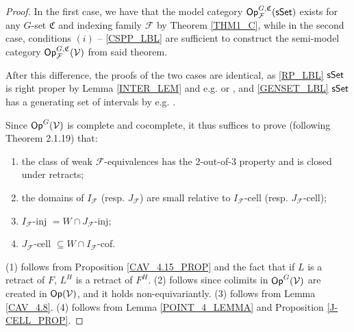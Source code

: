 \documentclass[a4paper,10pt
]{article}%
\renewcommand{\F}{\mathcal F}
\renewcommand{\1}{\ensuremath{\mathbb{id}}}
\begin{document}
\begin{proof}
      In the first case, we have that the model category $\Op^{G,\mathfrak C}_\F(\sSet)$ exists
      for any $G$-set $\mathfrak C$ and indexing family $\F$ by Theorem \ref{THM1_C},
      while in the second case, conditions $(i)$ -- \ref{CSPP_LBL} are sufficient to construct the
      semi-model category $\Op^{G, \mathfrak C}_\F(\V)$ from said theorem.
      
      After this difference, the proofs of the two cases are identical, as
      \ref{RP_LBL} $\mathsf{sSet}$ is right proper
      by Lemma \ref{INTER_LEM} and e.g. \cite[Prop 2.1.5]{Cis06} or \cite[Lemma 1.12]{BM13}, and
      \ref{GENSET_LBL} $\mathsf{sSet}$ has a generating set of intervals
      by e.g. \cite[Lemma 1.12]{BM13}.

      Since $\mathsf{Op}^G(\mathcal V)$ is complete and cocomplete, it thus suffices to prove (following \cite{Hov98} Theorem 2.1.19) that:
      \begin{enumerate}[label = (\arabic*)]
      \item the class of weak $\F$-equivalences has the 2-out-of-3 property and is closed under retracts;
      \item the domains of $I_{\F}$ (resp. $J_{\F}$) are small relative to $I_{\F}$-cell (resp. $J_{\F}$-cell);
      \item $I_{\F}$-inj $= W\cap J_{\F}$-inj;
      \item $J_{\F}$-cell $\subseteq W\cap I_{\F}$-cof.
      \end{enumerate}
      (1) follows from Proposition \ref{CAV_4.15_PROP} and the fact that if $L$ is a retract of $F$, $L^H$ is a retract of $F^H$.
      (2) follows since colimits in $\mathsf{Op}^G(\mathcal V)$ are created in $\mathsf{Op}(\mathcal V)$, and it holds non-equivariantly.
      (3) follows from Lemma \ref{CAV_4.8}.
      (4) follows from Lemma \ref{POINT_4_LEMMA} and Proposition \ref{J-CELL_PROP}.
\end{proof}

\end{document}
